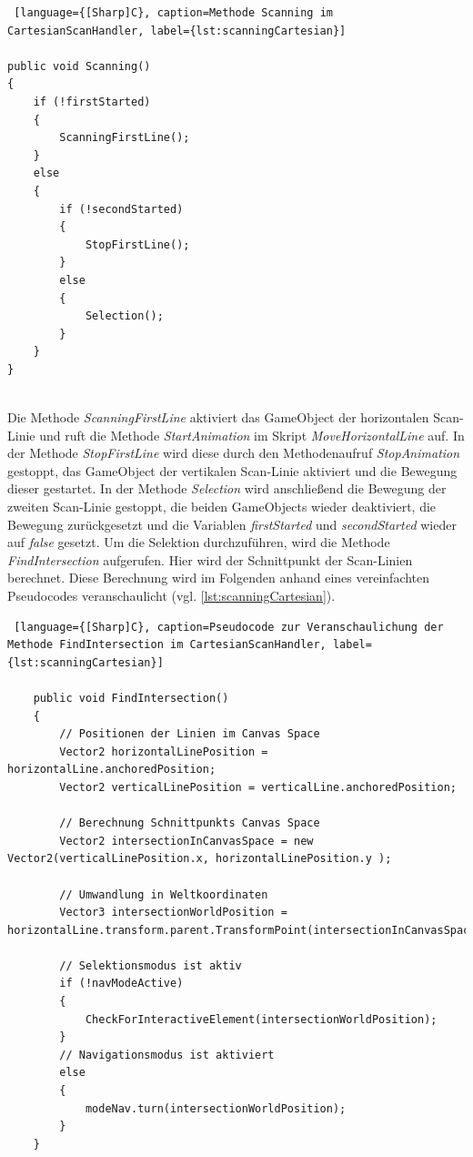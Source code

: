 \begin{lstlisting} [language={[Sharp]C}, caption=Methode Scanning im CartesianScanHandler, label={lst:scanningCartesian}]

public void Scanning()
{
    if (!firstStarted)
    {
        ScanningFirstLine();
    }
    else
    {
        if (!secondStarted)
        {
            StopFirstLine();
        }
        else
        {
            Selection();
        }
    }
}
    
\end{lstlisting}

Die Methode \textit{ScanningFirstLine} aktiviert das GameObject der horizontalen Scan-Linie und ruft die Methode \textit{StartAnimation} im Skript \textit{MoveHorizontalLine} auf. In der Methode \textit{StopFirstLine} wird diese durch den Methodenaufruf \textit{StopAnimation} gestoppt, das GameObject der vertikalen Scan-Linie aktiviert und die Bewegung dieser gestartet. In der Methode \textit{Selection} wird anschließend die Bewegung der zweiten Scan-Linie gestoppt, die beiden GameObjects wieder deaktiviert, die Bewegung zurückgesetzt und die Variablen \textit{firstStarted} und \textit{secondStarted} wieder auf \textit{false} gesetzt. Um die Selektion durchzuführen, wird die Methode \textit{FindIntersection} aufgerufen. Hier wird der Schnittpunkt der Scan-Linien berechnet. Diese Berechnung wird im Folgenden anhand eines vereinfachten Pseudocodes veranschaulicht (vgl. \autoref{lst:scanningCartesian}). 

\begin{lstlisting} [language={[Sharp]C}, caption=Pseudocode zur Veranschaulichung der Methode FindIntersection im CartesianScanHandler, label={lst:scanningCartesian}]

    public void FindIntersection()
    {
        // Positionen der Linien im Canvas Space
        Vector2 horizontalLinePosition = horizontalLine.anchoredPosition;
        Vector2 verticalLinePosition = verticalLine.anchoredPosition;
        
        // Berechnung Schnittpunkts Canvas Space
        Vector2 intersectionInCanvasSpace = new Vector2(verticalLinePosition.x, horizontalLinePosition.y );
        
        // Umwandlung in Weltkoordinaten
        Vector3 intersectionWorldPosition = horizontalLine.transform.parent.TransformPoint(intersectionInCanvasSpace);

        // Selektionsmodus ist aktiv
        if (!navModeActive)
	    {
            CheckForInteractiveElement(intersectionWorldPosition);
        }
        // Navigationsmodus ist aktiviert
        else
        {
            modeNav.turn(intersectionWorldPosition);
        }
    }

\end{lstlisting}

